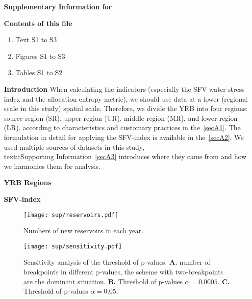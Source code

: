 \documentclass[draft,wrr]{../agutexSI2019}
\begin{document}
\noindent\textbf{\large{Supplementary Information for}}


\begin{article}

\noindent\textbf{Contents of this file}
\begin{enumerate}
\item Text S1 to S3
\item Figures S1 to S3
\item Tables S1 to S2
\end{enumerate}

\noindent\textbf{Introduction}
When calculating the indicators (especially the SFV water stress index and the allocation entropy metric), we should use data at a lower (regional scale in this study) spatial scale. Therefore, we divide the YRB into four regions: source region (SR), upper region (UR), middle region (MR), and lower region (LR), according to characteristics and customary practices in the~\ref{secA1}.
The formulation in detail for applying the SFV-index is available in the~\ref{secA2}.
We used multiple sources of datasets in this study, \\textit{Supporting Information}~\ref{secA3} introduces where they came from and how we harmonies them for analysis.

\noindent\textbf{YRB Regions}\label{secA1}


\noindent\textbf{SFV-index}\label{secA2}


\begin{figure}[tb]
\centering
\texttt{[image: sup/reservoirs.pdf]}
\caption{
      Numbers of new reservoirs in each year.
}\label{fig:reservoirs}
\end{figure}

\begin{figure}
\centering
\texttt{[image: sup/sensitivity.pdf]}
\caption{
      Sensitivity analysis of the threshold of p-values.
      \textbf{A.} number of breakpoints in different p-values, the scheme with two-breakpoints are the dominant situation.
      \textbf{B.} Threshold of p-values \(\alpha=0.0005\).
      \textbf{C.} Threshold of p-values \(\alpha=0.05\).
}\label{fig:sensitivity}
\end{figure}


\end{article}
\end{document}
